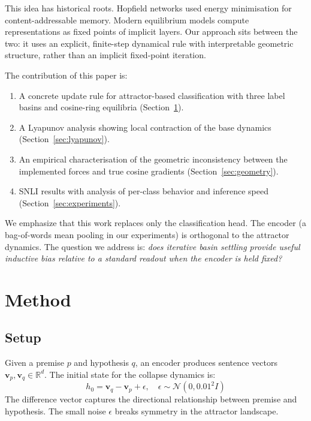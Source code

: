 \documentclass[11pt]{article}
\newcommand{\R}{\mathbb{R}}
\begin{document}
This idea has historical roots. Hopfield networks \citep{hopfield1982}
used energy minimisation for content-addressable memory. Modern
equilibrium models \citep{bai2019deep} compute representations as fixed
points of implicit layers. Our approach sits between the two: it uses
an explicit, finite-step dynamical rule with interpretable geometric
structure, rather than an implicit fixed-point iteration.

The contribution of this paper is:
\begin{enumerate}
    \item A concrete update rule for attractor-based classification
          with three label basins and cosine-ring equilibria (Section~\ref{sec:method}).
    \item A Lyapunov analysis showing local contraction of the base
          dynamics (Section~\ref{sec:lyapunov}).
    \item An empirical characterisation of the geometric inconsistency
          between the implemented forces and true cosine gradients
          (Section~\ref{sec:geometry}).
    \item SNLI results with analysis of per-class behavior and
          inference speed (Section~\ref{sec:experiments}).
\end{enumerate}

We emphasize that this work replaces only the classification head.
The encoder (a bag-of-words mean pooling in our experiments) is
orthogonal to the attractor dynamics. The question we address is:
\emph{does iterative basin settling provide useful inductive bias
relative to a standard readout when the encoder is held fixed?}

\section{Method}
\label{sec:method}

\subsection{Setup}

Given a premise $p$ and hypothesis $q$, an encoder produces sentence
vectors $\bm{v}_p, \bm{v}_q \in \R^d$. The initial state for the
collapse dynamics is:
\[
    h_0 = \bm{v}_q - \bm{v}_p + \epsilon, \quad \epsilon \sim \mathcal{N}(0, 0.01^2 I)
\]
The difference vector captures the directional relationship between
premise and hypothesis. The small noise $\epsilon$ breaks symmetry
in the attractor landscape.
\end{document}
